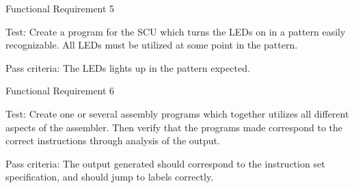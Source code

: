 {\sc Functional Requirement 5}
\begin{Test}
  {\em \FRV}
  
  {\sc Test:} Create a program for the \ac{SCU} which turns the \acp{LED} on in
  a pattern easily recognizable. All \acp{LED} must be utilized at some point
  in the pattern.

  {\sc Pass criteria:} The LEDs lights up in the pattern expected.
\end{Test}

\newpage %
{\sc Functional Requirement 6}
\begin{Test}
  {\em \FRVI}
  
  {\sc Test:} Create one or several assembly programs which together utilizes
  all different aspects of the assembler. Then verify that the programs made
  correspond to the correct instructions through analysis of the output.

  {\sc Pass criteria:} The output generated should correspond to the instruction
  set specification, and should jump to labels correctly.
\end{Test}


